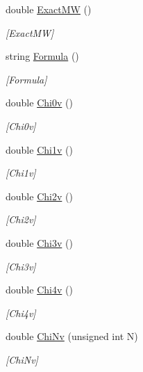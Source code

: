 \begin{DoxyCompactItemize}
double \mbox{\hyperlink{class_molecule_abd7a0835ce83bffd2422df8cdfb5b163}{Exact\+MW}} ()
\begin{DoxyCompactList}\small\item\em \mbox{[}Exact\+MW\mbox{]} \end{DoxyCompactList}\item 
string \mbox{\hyperlink{class_molecule_a2a8be2c496fe515635ad70949ca3c634}{Formula}} ()
\begin{DoxyCompactList}\small\item\em \mbox{[}Formula\mbox{]} \end{DoxyCompactList}\item 
double \mbox{\hyperlink{class_molecule_a7299912c0000b8f3520984400f72a86b}{Chi0v}} ()
\begin{DoxyCompactList}\small\item\em \mbox{[}Chi0v\mbox{]} \end{DoxyCompactList}\item 
double \mbox{\hyperlink{class_molecule_a867c7ad16812f1aafac38087eec756f4}{Chi1v}} ()
\begin{DoxyCompactList}\small\item\em \mbox{[}Chi1v\mbox{]} \end{DoxyCompactList}\item 
double \mbox{\hyperlink{class_molecule_a31a72034aa6769237eb794d923788584}{Chi2v}} ()
\begin{DoxyCompactList}\small\item\em \mbox{[}Chi2v\mbox{]} \end{DoxyCompactList}\item 
double \mbox{\hyperlink{class_molecule_ac708655c8a81d9e25fe414f43b1d0b1c}{Chi3v}} ()
\begin{DoxyCompactList}\small\item\em \mbox{[}Chi3v\mbox{]} \end{DoxyCompactList}\item 
double \mbox{\hyperlink{class_molecule_a26ca2dbe4464eee3cf0405c1a09fb310}{Chi4v}} ()
\begin{DoxyCompactList}\small\item\em \mbox{[}Chi4v\mbox{]} \end{DoxyCompactList}\item 
double \mbox{\hyperlink{class_molecule_ada6fd7f4b47622e5a07d80052cf0d0b5}{Chi\+Nv}} (unsigned int N)
\begin{DoxyCompactList}\small\item\em \mbox{[}Chi\+Nv\mbox{]} \end{DoxyCompactList}\item 

\end{DoxyCompactItemize}
